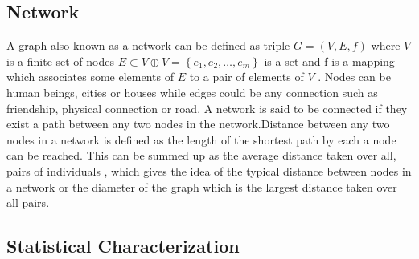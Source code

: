 \subsection{Network}


A graph also known as a network   can be  defined as triple $G = (V,E,f)$ where $V$ is a finite set of nodes $E \subset V \oplus V = \left\lbrace e_1,e_2,\dots ,e_m \right\rbrace$ is a set and f is a mapping which associates some elements of $E$ to a pair of elements of $V$ \citep{estrada2012structure}.
Nodes can be human beings, cities or houses while edges could be any connection such as friendship, physical connection or road.
A network is said to be connected if they exist a path between any two nodes in the network.Distance between any two nodes in a network is defined as the length of the shortest path by each a node can be reached.
This can be summed up as the average distance taken over all, pairs of individuals , which gives the idea of the typical distance between nodes in a network or the diameter of the graph which is the largest distance taken over all pairs.
 \subsection{Statistical Characterization}
 
